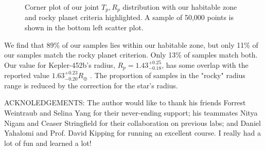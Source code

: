 \documentclass[modern]{aastex631}
\begin{document}
\begin{figure}
    \caption{Corner plot of our joint $T_p, R_p$ distribution with our habitable zone and rocky planet criteria highlighted. A sample of 50,000 points is shown in the bottom left scatter plot.}
    \label{fig:zone}
\end{figure}

We find that 89\% of our samples lies within our habitable zone, but only 11\% of our samples match the rocky planet criterion. Only 13\% of samples match both. Our value for Kepler-452b's radius, $R_p = 1.43^{+0.25}_{-0.18}$, has some overlap with the reported value $1.63^{+0.23}_{-0.20} R_\oplus$ \citep{jenkinsDISCOVERYVALIDATIONKepler452b2015}. The proportion of samples in the "rocky" radius range is reduced by the correction for the star's radius.


\begin{acknowledgments}
ACKNOLEDGEMENTS: The author would like to thank his friends Forrest Weintraub and Selina Yang for their never-ending support; his teammates Nitya Nigam and Ceaser Stringfield for their collaboration on previous labs; and Daniel Yahalomi and Prof. David Kipping for running an excellent course. I really had a lot of fun and learned a lot!
\end{acknowledgments}



{}



\end{document}

